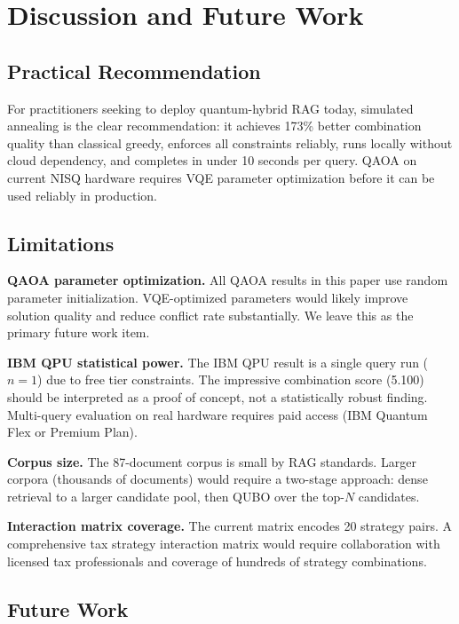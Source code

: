 \documentclass{article}
\begin{document}
\section{Discussion and Future Work}
\label{sec:discussion}

\subsection{Practical Recommendation}

For practitioners seeking to deploy quantum-hybrid RAG today, simulated
annealing is the clear recommendation: it achieves 173\% better
combination quality than classical greedy, enforces all constraints
reliably, runs locally without cloud dependency, and completes in under
10 seconds per query. QAOA on current NISQ hardware requires VQE
parameter optimization before it can be used reliably in production.

\subsection{Limitations}

\textbf{QAOA parameter optimization.} All QAOA results in this paper
use random parameter initialization. VQE-optimized parameters would
likely improve solution quality and reduce conflict rate substantially.
We leave this as the primary future work item.

\textbf{IBM QPU statistical power.} The IBM QPU result is a single
query run ($n=1$) due to free tier constraints. The impressive
combination score (5.100) should be interpreted as a proof of concept,
not a statistically robust finding. Multi-query evaluation on real
hardware requires paid access (IBM Quantum Flex or Premium Plan).

\textbf{Corpus size.} The 87-document corpus is small by RAG standards.
Larger corpora (thousands of documents) would require a two-stage
approach: dense retrieval to a larger candidate pool, then QUBO over
the top-$N$ candidates.

\textbf{Interaction matrix coverage.} The current matrix encodes 20
strategy pairs. A comprehensive tax strategy interaction matrix would
require collaboration with licensed tax professionals and coverage of
hundreds of strategy combinations.

\subsection{Future Work}
\end{document}
